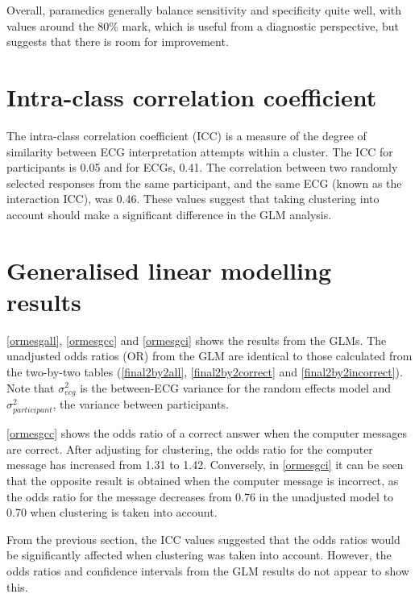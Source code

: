 Overall, paramedics generally balance sensitivity and specificity quite well, with values around the 80\% mark, which is useful from a diagnostic perspective, but suggests that there is room for improvement. 

\section{Intra-class correlation coefficient}
\label{intra-classcorrelationcoefficient}

The intra-class correlation coefficient (ICC) is a measure of the degree of similarity between ECG interpretation attempts within a cluster. The ICC for participants is 0.05 and for ECGs, 0.41. The correlation between two randomly selected responses from the same participant, and the same ECG (known as the interaction ICC), was 0.46. These values suggest that taking clustering into account should make a significant difference in the GLM analysis.

\section{Generalised linear modelling results}
\label{generalisedlinearmodellingresults}

\autoref{ormesgall}, \autoref{ormesgcc} and \autoref{ormesgci} shows the results from the GLMs. The unadjusted odds ratios (OR) from the GLM are identical to those calculated from the two-by-two tables (\autoref{final2by2all}, \autoref{final2by2correct} and \autoref{final2by2incorrect}). Note that $ \sigma^2_{ecg}$ is the between-ECG variance for the random effects model and $ \sigma^2_{participant}$, the variance between participants. 

    

\autoref{ormesgcc} shows the odds ratio of a correct answer when the computer messages are correct. After adjusting for clustering, the odds ratio for the computer message has increased from 1.31 to 1.42. Conversely, in \autoref{ormesgci} it can be seen that the opposite result is obtained when the computer message is incorrect, as the odds ratio for the message decreases from 0.76 in the unadjusted model to 0.70 when clustering is taken into account.
    

    

From the previous section, the ICC values suggested that the odds ratios would be significantly affected when clustering was taken into account. However, the odds ratios and confidence intervals from the GLM results do not appear to show this.
